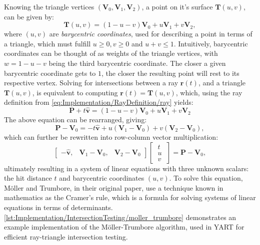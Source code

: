 Knowing the triangle vertices $ (\bm{V}_0, \bm{V}_1, \bm{V}_2) $, a point on it's surface $ \bm{T}(u, v) $, can be given by:
%
\begin{equation}
    \bm{T}(u, v) = (1 - u - v)\bm{V}_0 + u \bm{V}_1 + v \bm{V}_2,
\end{equation}
%
where $ (u, v) $ are \textit{barycentric coordinates}, used for describing a point in terms of a triangle, which must fulfill $ u \ge 0, v \ge 0 $ and $ u + v \le 1 $.
Intuitively, barycentric coordinates can be thought of as weights of the triangle vertices, with $ w = 1 - u - v $ being the third barycentric coordinate. 
The closer a given barycentric coordinate gets to $ 1 $, the closer the resulting point will rest to its respective vertex.
Solving for intersections between a ray $ \bm{r}(t) $, and a triangle $ \bm{T}(u, v) $, is equivalent to computing  $ \bm{r}(t) = \bm{T}(u, v) $, which, using the ray definition from \cref{eq:Implementation/RayDefinition/ray} yields:
%
\begin{equation}
    \bm{P} + t\bm{\hat{v}} = (1 - u - v)\bm{V}_0 + u \bm{V}_1 + v \bm{V}_2
\end{equation}
%
The above equation can be rearranged, giving:
%
\begin{equation}
    \bm{P} - \bm{V}_0 = -t\bm{\hat{v}} + u(\bm{V}_1 - \bm{V}_0) + v(\bm{V}_2 - \bm{V}_0),
\end{equation}
%
which can further be rewritten into row-column vector multiplication:
%
\begin{equation}
    \begin{bmatrix}
        -\bm{\hat{v}}, & \bm{V}_1 - \bm{V}_0, & \bm{V}_2 - \bm{V}_0
    \end{bmatrix}%
    \begin{bmatrix}
        \; t \; \\ \; u \; \\ \; v \;
    \end{bmatrix} = \bm{P} - \bm{V}_0,
\end{equation}
%
ultimately resulting in a system of linear equations with three unknown scalars: the hit distance $ t $ and barycentric coordinates $ (u, v) $.
To solve this equation, M{\"o}ller and Trumbore, in their original paper, use a technique known in mathematics as the Cramer's rule, which is a formula for solving systems of linear equations in terms of determinants. 
\cref{lst:Implementation/IntersectionTesting/moller_trumbore} demonstrates an example implementation of the M{\"o}ller-Trumbore algorithm, used in YART for efficient ray-triangle intersection testing.

